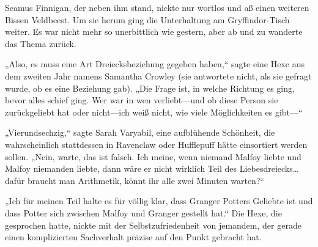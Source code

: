 
Seamus Finnigan, der neben ihm stand, nickte nur wortlos und aß einen weiteren Bissen Veldbeest. Um sie herum ging die Unterhaltung am Gryffindor-Tisch weiter. Es war nicht mehr so unerbittlich wie gestern, aber ab und zu wanderte das Thema zurück.

„Also, es muss eine Art Dreiecksbeziehung gegeben haben,“ sagte eine Hexe aus dem zweiten Jahr namens Samantha Crowley (sie antwortete nicht, als sie gefragt wurde, ob es eine Beziehung gab). „Die Frage ist, in welche Richtung es ging, bevor alles schief ging. Wer war in wen verliebt—und ob diese Person sie zurückgeliebt hat oder nicht—ich weiß nicht, wie viele Möglichkeiten es gibt—“

„Vierundsechzig,“ sagte Sarah Varyabil, eine aufblühende Schönheit, die wahrscheinlich stattdessen in Ravenclaw oder Hufflepuff hätte einsortiert werden sollen. „Nein, warte, das ist falsch. Ich meine, wenn niemand Malfoy liebte und Malfoy niemanden liebte, dann wäre er nicht wirklich Teil des Liebesdreiecks…dafür braucht man Arithmetik, könnt ihr alle zwei Minuten warten?“

„Ich für meinen Teil halte es für völlig klar, dass Granger Potters Geliebte ist und dass Potter sich zwischen Malfoy und Granger gestellt hat.“ Die Hexe, die gesprochen hatte, nickte mit der Selbstzufriedenheit von jemandem, der gerade einen komplizierten Sachverhalt präzise auf den Punkt gebracht hat.


